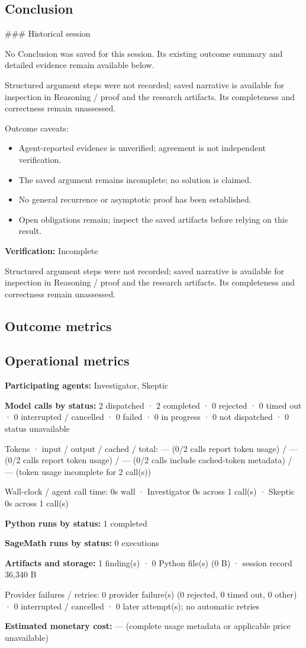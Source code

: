 \documentclass[11pt]{article}
\begin{document}
\subsection{Conclusion}
\#\#\# Historical session

No Conclusion was saved for this session. Its existing outcome summary and detailed evidence remain available below.

Structured argument steps were not recorded; saved narrative is available for inspection in Reasoning / proof and the research artifacts. Its completeness and correctness remain unassessed.\par
Outcome caveats:\par
\begin{itemize}
\item Agent-reported evidence is unverified; agreement is not independent verification.
\item The saved argument remains incomplete; no solution is claimed.
\item No general recurrence or asymptotic proof has been established.
\item Open obligations remain; inspect the saved artifacts before relying on this result.
\end{itemize}
\textbf{Verification:} Incomplete\par
Structured argument steps were not recorded; saved narrative is available for inspection in Reasoning / proof and the research artifacts. Its completeness and correctness remain unassessed.\par
\subsection{Outcome metrics}
\subsection{Operational metrics}
\textbf{Participating agents:} Investigator, Skeptic\par
\textbf{Model calls by status:} 2 dispatched · 2 completed · 0 rejected · 0 timed out · 0 interrupted / cancelled · 0 failed · 0 in progress · 0 not dispatched · 0 status unavailable\par
Tokens · input / output / cached / total: — (0/2 calls report token usage) / — (0/2 calls report token usage) / — (0/2 calls include cached-token metadata) / — (token usage incomplete for 2 call(s))\par
Wall-clock / agent call time: 0s wall · Investigator 0s across 1 call(s) · Skeptic 0s across 1 call(s)\par
\textbf{Python runs by status:} 1 completed\par
\textbf{SageMath runs by status:} 0 executions\par
\textbf{Artifacts and storage:} 1 finding(s) · 0 Python file(s) (0 B) · session record 36,340 B\par
Provider failures / retries: 0 provider failure(s) (0 rejected, 0 timed out, 0 other) · 0 interrupted / cancelled · 0 later attempt(s); no automatic retries\par
\textbf{Estimated monetary cost:} — (complete usage metadata or applicable price unavailable)\par
\end{document}
